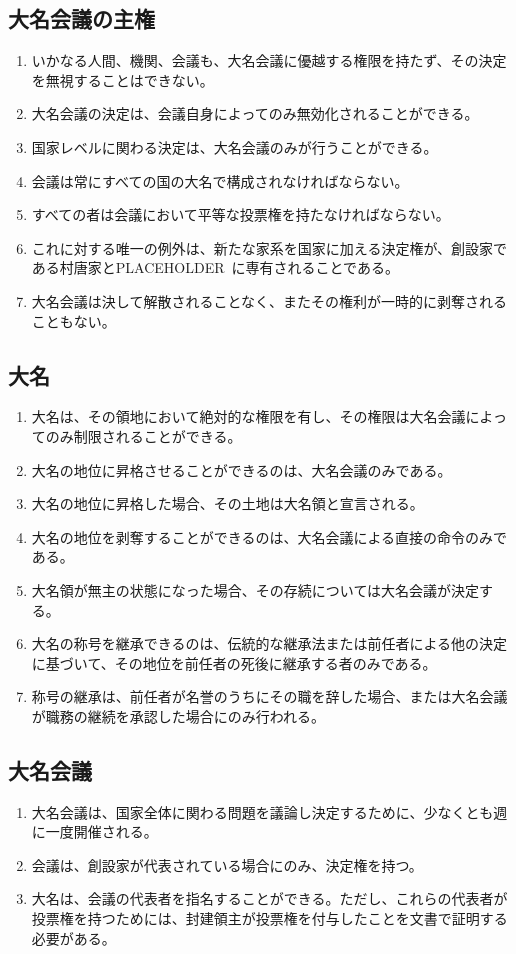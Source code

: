 \documentclass{article}
\newcommand{\pl}{PLACEHOLDER\ }
\begin{document}
\subsection{大名会議の主権}
\begin{enumerate}
    \item いかなる人間、機関、会議も、大名会議に優越する権限を持たず、その決定を無視することはできない。
    \item 大名会議の決定は、会議自身によってのみ無効化されることができる。
    \item 国家レベルに関わる決定は、大名会議のみが行うことができる。
    \item 会議は常にすべての国の大名で構成されなければならない。
    \item すべての者は会議において平等な投票権を持たなければならない。
    \item これに対する唯一の例外は、新たな家系を国家に加える決定権が、創設家である村唐家と\pl に専有されることである。
    \item 大名会議は決して解散されることなく、またその権利が一時的に剥奪されることもない。
\end{enumerate}

\subsection{大名}
\begin{enumerate}
    \item 大名は、その領地において絶対的な権限を有し、その権限は大名会議によってのみ制限されることができる。
    \item 大名の地位に昇格させることができるのは、大名会議のみである。
    \item 大名の地位に昇格した場合、その土地は大名領と宣言される。
    \item 大名の地位を剥奪することができるのは、大名会議による直接の命令のみである。
    \item 大名領が無主の状態になった場合、その存続については大名会議が決定する。
    \item 大名の称号を継承できるのは、伝統的な継承法または前任者による他の決定に基づいて、その地位を前任者の死後に継承する者のみである。
    \item 称号の継承は、前任者が名誉のうちにその職を辞した場合、または大名会議が職務の継続を承認した場合にのみ行われる。
\end{enumerate}

\subsection{大名会議}
\begin{enumerate}
    \item 大名会議は、国家全体に関わる問題を議論し決定するために、少なくとも週に一度開催される。
    \item 会議は、創設家が代表されている場合にのみ、決定権を持つ。
    \item 大名は、会議の代表者を指名することができる。ただし、これらの代表者が投票権を持つためには、封建領主が投票権を付与したことを文書で証明する必要がある。
\end{enumerate}
\end{document}
